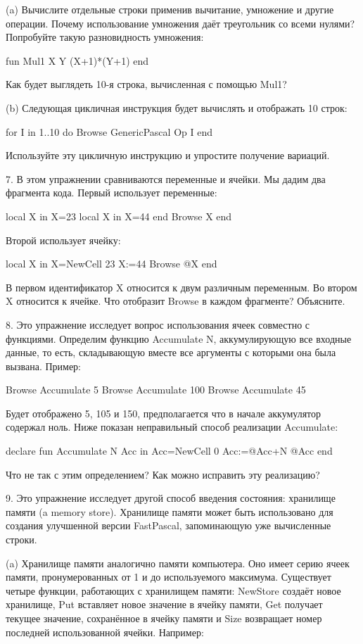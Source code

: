 (a) Вычислите отдельные строки применив вычитание, умножение и другие операции. Почему использование умножения даёт треугольник со всеми нулями? Попробуйте такую разновидность умножения:

fun {Mul1 X Y} (X+1)*(Y+1) end

Как будет выглядеть 10-я строка, вычисленная с помощью Mul1?

(b) Следующая цикличная инструкция будет вычислять и отображать 10 строк:

for I in 1..10 do {Browse {GenericPascal Op I}} end

Используйте эту цикличную инструкцию и упростите получение вариаций.

7. В этом упражнении сравниваются переменные и ячейки. Мы дадим два фрагмента кода. Первый использует переменные:

local X in
X=23
local X in
X=44
end
{Browse X}
end

Второй использует ячейку:

local X in
X={NewCell 23}
X:=44
{Browse @X}
end

В первом идентификатор X относится к двум различным переменным. Во втором X относится к ячейке. Что отобразит Browse в каждом фрагменте? Объясните.

8. Это упражнение исследует вопрос использования ячеек совместно с функциями. Определим функцию {Accumulate N}, аккумулирующую все входные данные, то есть, складывающую вместе все аргументы с которыми она была вызвана. Пример:

{Browse {Accumulate 5}}
{Browse {Accumulate 100}}
{Browse {Accumulate 45}}

Будет отображено 5, 105 и 150, предполагается что в начале аккумулятор содержал ноль. Ниже показан неправильный способ реализации Accumulate:

declare
fun {Accumulate N}
Acc in
Acc={NewCell 0}
Acc:=@Acc+N
@Acc
end

Что не так с этим определением? Как можно исправить эту реализацию?

9. Это упражнение исследует другой способ введения состояния: хранилище памяти (a memory store). Хранилище памяти может быть использовано для создания улучшенной версии FastPascal, запоминающую уже вычисленные строки.

(a) Хранилище памяти аналогично памяти компьютера. Оно имеет серию ячеек памяти, пронумерованных от 1 и до используемого максимума. Существует четыре функции, работающих с хранилищем памяти: NewStore создаёт новое хранилище, Put вставляет новое значение в ячейку памяти, Get получает текущее значение, сохранённое в ячейку памяти и Size возвращает номер последней использованной ячейки. Например:

